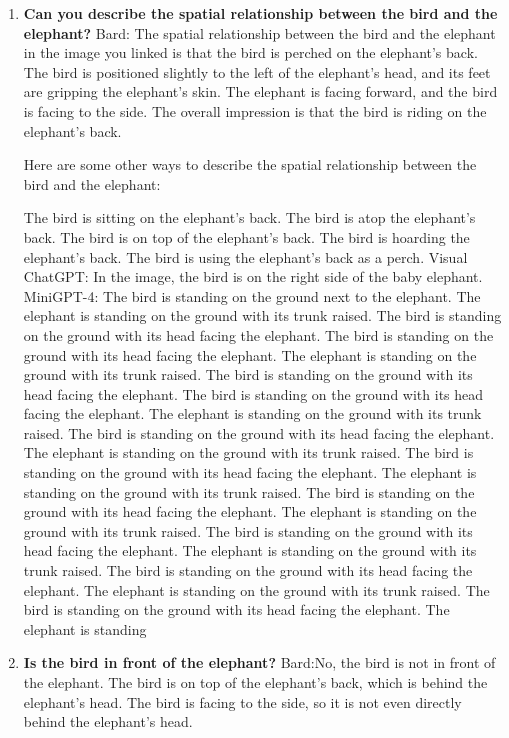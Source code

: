     \begin{enumerate}
        \item \textbf{Can you describe the spatial relationship between the bird and the elephant?}
        \subitem Bard:
        The spatial relationship between the bird and the elephant in the image you linked is that the bird is perched on the elephant's back. The bird is positioned slightly to the left of the elephant's head, and its feet are gripping the elephant's skin. The elephant is facing forward, and the bird is facing to the side. The overall impression is that the bird is riding on the elephant's back.
        
        Here are some other ways to describe the spatial relationship between the bird and the elephant:
        
        The bird is sitting on the elephant's back.
        The bird is atop the elephant's back.
        The bird is on top of the elephant's back.
        The bird is hoarding the elephant's back.
        The bird is using the elephant's back as a perch.
        \subitem Visual ChatGPT: In the image, the bird is on the right side of the baby elephant.
        \subitem MiniGPT-4: The bird is standing on the ground next to the elephant. The elephant is standing on the ground with its trunk raised. The bird is standing on the ground with its head facing the elephant. The bird is standing on the ground with its head facing the elephant. The elephant is standing on the ground with its trunk raised. The bird is standing on the ground with its head facing the elephant. The bird is standing on the ground with its head facing the elephant. The elephant is standing on the ground with its trunk raised. The bird is standing on the ground with its head facing the elephant. The elephant is standing on the ground with its trunk raised. The bird is standing on the ground with its head facing the elephant. The elephant is standing on the ground with its trunk raised. The bird is standing on the ground with its head facing the elephant. The elephant is standing on the ground with its trunk raised. The bird is standing on the ground with its head facing the elephant. The elephant is standing on the ground with its trunk raised. The bird is standing on the ground with its head facing the elephant. The elephant is standing on the ground with its trunk raised. The bird is standing on the ground with its head facing the elephant. The elephant is standing
        \item \textbf{Is the bird in front of the elephant?}
        \subitem Bard:No, the bird is not in front of the elephant. The bird is on top of the elephant's back, which is behind the elephant's head. The bird is facing to the side, so it is not even directly behind the elephant's head.


\end{enumerate}
